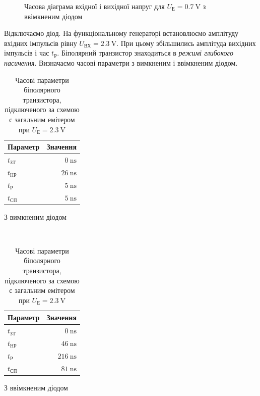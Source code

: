 \documentclass[a4paper,oneside,DIV=10,12pt]{scrartcl}
\begin{document}
		
		\begin{figure}[H]
		\label{fig:u0p7diode}
		\centering
			\def\svgwidth{\columnwidth}
			
		\caption{Часова діаграма вхідної і вихідної напруг для $U_{\text{Е}} = \SI{0,7}{\volt}$ з ввімкненим діодом}
		\end{figure}
		
		
		Відключаємо діод. На функціональному генераторі встановлюємо амплітуду вхідних імпульсів рівну $U_{\text{ВХ}} = \SI{2,3}{\volt}$. При цьому збільшились амплітуда вихідних імпульсів і час $t_{\text{Р}}$. Біполярний транзистор знаходиться в \emph{режимі глибокого насичення}. Визначаємо часові параметри з вимкненим і ввімкненим діодом.
		
		\begin{table}[H]
		\centering
			\begin{subtable}[h]{0.4\textwidth}
			\centering
				\begin{tabular}{lr}
				\toprule
				Параметр & Значення\\
				\midrule
				$t_{\text{ЗТ}}$ & $\SI{0}{\nano\second}$\\
				$t_{\text{НР}}$ & $\SI{26}{\nano\second}$\\
				$t_{\text{Р}}$ & $\SI{5}{\nano\second}$\\
				$t_{\text{СП}}$ & $\SI{5}{\nano\second}$\\
				\bottomrule
				\end{tabular}
				\caption{З вимкненим діодом}
			\end{subtable}
			~
			\begin{subtable}[h]{0.4\textwidth}
			\centering
				\begin{tabular}{lr}
				\toprule
				Параметр & Значення\\
				\midrule
				$t_{\text{ЗТ}}$ & $\SI{0}{\nano\second}$\\
				$t_{\text{НР}}$ & $\SI{46}{\nano\second}$\\
				$t_{\text{Р}}$ & $\SI{216}{\nano\second}$\\
				$t_{\text{СП}}$ & $\SI{81}{\nano\second}$\\
				\bottomrule
				\end{tabular}
				\caption{З ввімкненим діодом}
			\end{subtable}
			
		\caption{Часові параметри біполярного транзистора, підключеного за схемою с загальним емітером при $U_{\text{Е}} = \SI{2,3}{\volt}$}
		\end{table}
		
\end{document}
